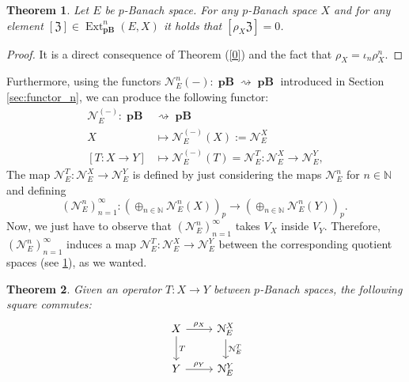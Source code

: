 \documentclass[12pt,a4paper]{amsproc}
\newtheorem{thm}{Theorem}[section]
\theoremstyle{remark}
\theoremstyle{definition}
\newcommand{\Ext}{\operatorname{Ext}}
\newcommand{\pBan}{\operatorname{\textbf{pB}}}
\numberwithin{equation}{section}
\begin{document}
\begin{thm}\label{equal0}
	Let $E$ be $p$-Banach space. For any $p$-Banach space $X$ and for any element $[\mathfrak{Z}] \in \Ext^n_{\pBan}(E,X)$ it holds that $[\rho_X \mathfrak{Z}]=0$.
\end{thm}
\begin{proof} It is a direct consequence of Theorem (\ref{0}) and the fact that $\rho_X=\iota_n\rho_X^n$.
\end{proof}
\par Furthermore, using the functors $\mathcal{N}_E^n(-):\pBan \rightsquigarrow \pBan$ introduced in Section \ref{sec:functor_n}, we can produce the following functor:
\begin{align*}
	\mathcal{N}_E^{(-)}:  \pBan & \rightsquigarrow \pBan \\
	X&  \mapsto \mathcal{N}_E^{(-)}(X):=\mathcal{N}_E^X \\
	[T:X \to Y] & \mapsto \mathcal{N}_E^{(-)}(T)=\mathcal{N}_E^T:\mathcal{N}_E^X \to \mathcal{N}_E^Y,
\end{align*}
The map $\mathcal{N}_E^T:\mathcal{N}_E^X \to \mathcal{N}_E^Y$ is defined by just considering the maps $\mathcal N_E^n$ for $n\in \mathbb N$ and defining
\[(\mathcal{N}_E^n)_{n=1}^\infty:\left( \oplus_{n \in \mathbb N} \mathcal{N}^n_E(X) \right)_p \to \left( \oplus_{n \in \mathbb N} \mathcal{N}^n_E(Y) \right)_p. \ \]
Now, we just have to observe that $(\mathcal N_E^n)_{n=1}^\infty$ takes $V_X$ inside $V_Y$. Therefore, $(\mathcal{N}_E^n)_{n=1}^\infty$ induces a map $\mathcal{N}_E^T:\mathcal{N}_E^X \to \mathcal{N}_E^Y$ between the corresponding quotient spaces  (see \ref{equal0}), as we wanted.

\begin{thm}
	Given an operator $T:X \to Y$ between $p$-Banach spaces, the following square commutes:
	\begin{equation}
		\label{square2}
		\begin{tikzcd}
			X \arrow[r, "\rho_X"] \arrow[d, "T"] & \mathcal{N}_E^X \arrow[d, "\mathcal{N}_E^T"] \\
			Y \arrow[r, "\rho_Y"]                & \mathcal{N}_E^Y                                   
		\end{tikzcd}
	\end{equation}
\end{thm}
\end{document}
